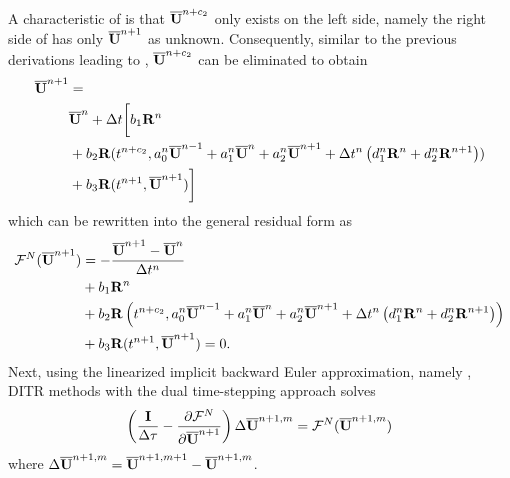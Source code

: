 A characteristic of  is that
$\overline{\mathbf{U}}^{n+c_2}$ only exists on the left side, namely the
right side of  has only $\overline{\mathbf{U}}^{n+1}$ as
unknown. Consequently, similar
to the previous derivations leading to ,
$\overline{\mathbf{U}}^{n+c_2}$ can be eliminated to obtain
\begin{equation}
    \begin{aligned}
        \overline{\mathbf{U}}^{n+1} & =                       \\
                  & \overline{\mathbf{U}}^{n} + {\Delta} t\biggl[
        b_1 \mathbf{R}^n                            \\
                  & +
            b_2 \mathbf{R}(t^{n+c_2},a^n_0\overline{\mathbf{U}}^{n - 1} +
            a^n_1\overline{\mathbf{U}}^{n} +
            a^n_2\overline{\mathbf{U}}^{n + 1}
            +
            {\Delta} t^n
            \left(
            d^n_1\mathbf{R}^{n} +
            d^n_2\mathbf{R}^{n + 1}
        \right))                            \\
                  & +
            b_3 \mathbf{R}(t^{n+1},\overline{\mathbf{U}}^{n+1})
            \biggr]
        \label{eq:nestedDITR}
    \end{aligned}
\end{equation}
which can be rewritten into the general residual form 
as
\begin{equation}
    \begin{aligned}
        \mathcal{F}^N(\overline{\mathbf{U}}^{n+1}) & = -\frac{\overline{\mathbf{U}}^{n+1} - \overline{\mathbf{U}}^{n}}{{\Delta} t^n} \\
                         & +
        b_1 \mathbf{R}^n                                                   \\
                         & +
        b_2 \mathbf{R}\left(t^{n+c_2},a^n_0\overline{\mathbf{U}}^{n - 1} +
        a^n_1\overline{\mathbf{U}}^{n} +
        a^n_2\overline{\mathbf{U}}^{n + 1}
        +
        {\Delta} t^n
        \left(
        d^n_1\mathbf{R}^{n} +
        d^n_2\mathbf{R}^{n + 1}
        \right)\right)                                             \\
                         & +
        b_3 \mathbf{R}(t^{n+1},\overline{\mathbf{U}}^{n+1}) = 0.
        \label{eq:nestedDITR_F}
    \end{aligned}
\end{equation}
Next, using the linearized implicit backward Euler approximation,
namely , 
DITR methods with the dual time-stepping approach solves
\begin{equation}
    \left(\frac{\eye}{\inc\tau} -
    \partialderivative{\FF^N}{\uu^{n+1}}  \right)
    \inc\uu^{n+1,m} = \FF^N(\uu^{n+1,m})
    \label{eq:abstractNewtonNested}
\end{equation}
where ${\Delta}\overline{\mathbf{U}}^{n+1,m}=\overline{\mathbf{U}}^{n+1,m+1}-\overline{\mathbf{U}}^{n+1,m}$.

